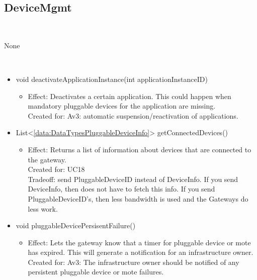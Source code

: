   \subsection{DeviceMgmt}\label{int:GatewayGatewayFacadeDeviceMgmt}
    \begin{description}
      \item[Provided by:] \iconcomponent{}~
      \item[Required by:] None
      \item[Operations:] ~
    \begin{itemize}[noitemsep,nolistsep,leftmargin=-.25cm]
      \item \textsf{void deactivateApplicationInstance(int applicationInstanceID)}
        \begin{itemize}[noitemsep,nolistsep]
           \item Effect: Deactivates a certain application. This could happen when mandatory pluggable devices for the application are missing.\\
Created for: Av3: automatic suspension/reactivation of applications.
        \end{itemize}
      \item \textsf{List\textless{}\ref{data:DataTypesPluggableDeviceInfo}\textgreater{} getConnectedDevices()}
        \begin{itemize}[noitemsep,nolistsep]
           \item Effect: Returns a list of information about devices that are connected to the gateway. \\
Created for: UC18 \\
Tradeoff: send PluggableDeviceID instead of DeviceInfo. If you send DeviceInfo, then  does not have to fetch this info. If you send PluggableDeviceID's, then less bandwidth is used and the Gateways do less work.
        \end{itemize}
      \item \textsf{void pluggableDevicePersisentFailure()}
        \begin{itemize}[noitemsep,nolistsep]
           \item Effect: Lets the gateway know that a timer for pluggable device or mote has expired. This will generate a notification for an infrastructure owner. \\
Created for: Av3: The infrastructure owner should be notified of any persistent pluggable device or mote failures.

\end{itemize}
\end{itemize}
\end{description}
